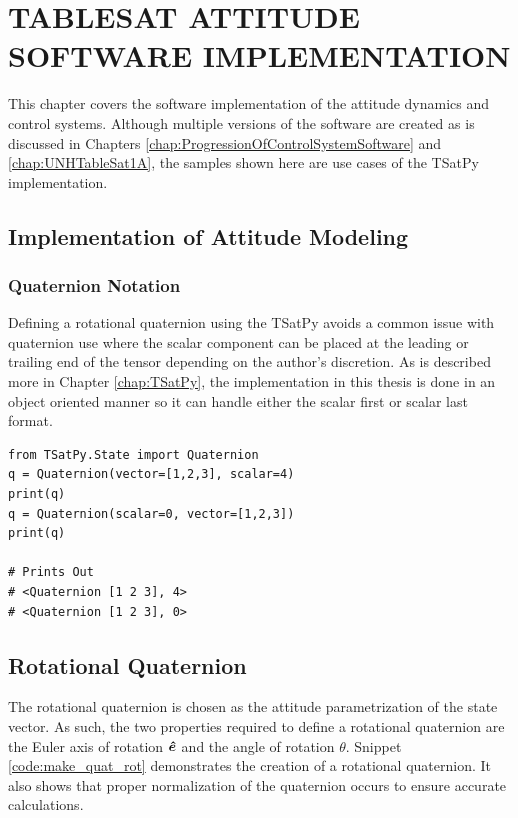 
\chapter{TABLESAT ATTITUDE SOFTWARE IMPLEMENTATION}
\label{chap:TableSatAttitudeDynamicsSoftware}

This chapter covers the software implementation of the attitude dynamics and control systems.  Although multiple versions of the software are created as is discussed in Chapters \ref{chap:ProgressionOfControlSystemSoftware} and \ref{chap:UNHTableSat1A}, the samples shown here are use cases of the TSatPy implementation.

\section{Implementation of Attitude Modeling}
\label{sec:ImplementationofAttitudeModeling}


\subsection{Quaternion Notation}
\label{subsec:Implementation-QuaternionNotation}

Defining a rotational quaternion using the TSatPy avoids a common issue with quaternion use where the scalar component can be placed at the leading or trailing end of the tensor depending on the author's discretion.  As is described more in Chapter \ref{chap:TSatPy}, the implementation in this thesis is done in an object oriented manner so it can handle either the scalar first or scalar last format.

\begin{singlespace}
  \begin{verbatim}
from TSatPy.State import Quaternion
q = Quaternion(vector=[1,2,3], scalar=4)
print(q)
q = Quaternion(scalar=0, vector=[1,2,3])
print(q)

# Prints Out
# <Quaternion [1 2 3], 4>
# <Quaternion [1 2 3], 0>
  \end{verbatim}
  \nocite{minted}
\end{singlespace}

\section{Rotational Quaternion}
\label{sec:Implementation-RotationalQuaternion}

The rotational quaternion is chosen as the attitude parametrization of the state vector.  As such, the two properties required to define a rotational quaternion are the Euler axis of rotation $\boldsymbol{\hat{e}}$ and the angle of rotation $\theta$.  Snippet \ref{code:make_quat_rot} demonstrates the creation of a rotational quaternion.  It also shows that proper normalization of the quaternion occurs to ensure accurate calculations.

